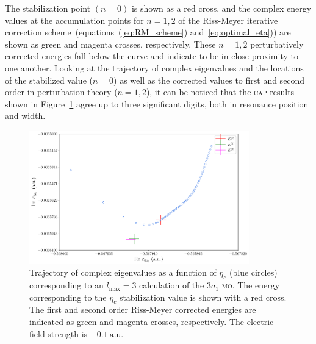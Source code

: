 The stabilization point $(n = 0)$ is shown as a red cross, and the
complex energy values at the accumulation points for $n = 1, 2$ of the
Riss-Meyer iterative correction scheme~(equations~(\ref{eq:RM_scheme})
and~\ref{eq:optimal_eta})) are shown as green and magenta crosses,
respectively. These $n = 1, 2$ perturbatively corrected energies fall
below the curve and indicate to be in close proximity to one
another. Looking at the trajectory of complex eigenvalues and the
locations of the stabilized value ($n = 0$) as well as the corrected
values to first and second order in perturbation theory ($n = 1, 2$),
it can be noticed that the \textsc{cap} results shown in
Figure~\ref{fig:3a1_RMtrajectory} agree up to three significant
digits, both in resonance position and width.



\begin{figure}
  \centering
  \includegraphics[width=0.85\textwidth]{figures/ch_H2O/partial_wave/3a1trajectory.pdf}
  \caption{Trajectory of complex eigenvalues as a function of
    $\eta_{c}$ (blue circles) corresponding to an $l_{\mathrm{max}}=3$
    calculation of the $3a_{1}$ \textsc{mo}. The energy corresponding
    to the $\eta_{c}$ stabilization value is shown with a red
    cross. The first and second order Riss-Meyer corrected energies
    are indicated as green and magenta crosses, respectively. The
    electric field strength is $-0.1\ \mathrm{a.u.}$}
  \label{fig:3a1_RMtrajectory}
\end{figure}




















